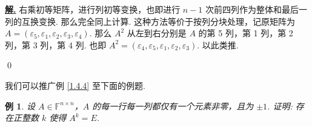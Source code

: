 \documentclass[10pt,openany]{article}
\theoremstyle{thmstyle} %
\theoremstyle{defstyle} %
\theoremstyle{prostyle} %
\theoremstyle{exastyle}
\newtheorem{example}[theorem]{例}
\theoremstyle{remstyle}
\newenvironment{solution}{\par\underline{\textbf{解.}} \;\fangsong}{\qed\par}
\newcommand{\F}{\mathbb{F}}
\newcommand{\n}{^{n \times n}}
\begin{document}
\begin{solution}
	右乘初等矩阵，进行列初等变换，也即进行 \( n-1 \) 次前四列作为整体和最后一列的互换变换. 那么完全同上计算. 这种方法等价于按列分块处理，记原矩阵为 \( A=(\varepsilon_5,\varepsilon_1,\varepsilon_2,\varepsilon_3,\varepsilon_4) \). 那么 \( A^2 \) 从左到右分别是 \( A \) 的第 5 列，第 1 列，第 2 列，第 3 列，第 4 列. 也即 \( A^2=(\varepsilon_4,\varepsilon_5,\varepsilon_1,\varepsilon_2,\varepsilon_3) \). 以此类推. 
	
	\vspace{1ex}
	
\end{solution}

我们可以推广例 \ref{1.4.4} 至下面的例题.

\begin{example}
    设 \( A \in \F\n \)，\( A \) 的每一行每一列都仅有一个元素非零，且为 \( \pm 1 \). 证明: 存在正整数 \( k \) 使得 \( A^k=E \).	
\end{example}
\end{document}
